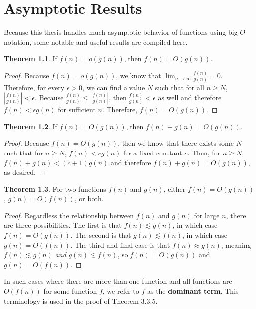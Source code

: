 \documentclass{scrippsthesisclass}
\theoremstyle{definition}
\newtheorem{theorem}{Theorem}[section]
\begin{document}


\appendix

\chapter{Asymptotic Results}
Because this thesis handles much asymptotic behavior of functions using big-$O$ notation, some notable and useful results are compiled here. 

\begin{theorem}
    If $f(n) = o(g(n))$, then $f(n) = O(g(n))$. 
\end{theorem}
\begin{proof}
    Because $f(n) = o(g(n))$, we know that $\lim_{n \to \infty} \frac{f(n)}{g(n)} = 0$. 
    Therefore, for every $\epsilon > 0$, we can find a value $N$ such that for all $n \geq N$, $\left|\frac{f(n)}{g(n)}\right| < \epsilon$. 
    Because $\frac{f(n)}{g(n)} \leq \left|\frac{f(n)}{g(n)}\right|$, then $\frac{f(n)}{g(n)} < \epsilon$ as well and therefore $f(n) < \epsilon g(n)$ for sufficient $n$. 
    Therefore, $f(n) = O(g(n))$.
\end{proof}

\begin{theorem}
    If $f(n) = O(g(n))$, then $f(n) + g(n) = O(g(n))$.
\end{theorem}
\begin{proof}
    Because $f(n) = O(g(n))$, then we know that there exists some $N$ such that for $n \geq N$, $f(n) < cg(n)$ for a fixed constant $c$. 
    Then, for $n \geq N$, $f(n) + g(n) < (c + 1) g(n)$ and therefore $f(n) + g(n) = O(g(n))$, as desired. 
\end{proof}

\begin{theorem}
    For two functions $f(n)$ and $g(n)$, either $f(n) = O(g(n))$, $g(n) = O(f(n))$, or both. 
\end{theorem}
\begin{proof}
    Regardless the relationship between $f(n)$ and $g(n)$ for large $n$, there are three possibilities. 
    The first is that $f(n) \lesssim g(n)$, in which case $f(n) = O(g(n))$. 
    The second is that $g(n) \lesssim f(n)$, in which case $g(n) = O(f(n))$. 
    The third and final case is that $f(n) \approx g(n)$, meaning $f(n) \lesssim g(n)$ \textit{and} $g(n) \lesssim f(n)$, so $f(n) = O(g(n))$ and $g(n) = O(f(n))$.
\end{proof}
In such cases where there are more than one function and all functions are $O(f(n))$ for some function $f$, we refer to $f$ as the \textbf{dominant term}. 
This terminology is used in the proof of Theorem 3.3.5.
\end{document}
